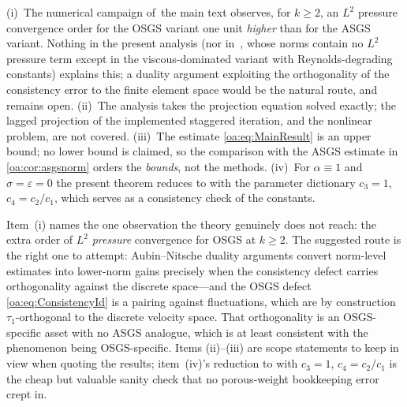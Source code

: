\begin{remark}
\label{oa:rem:open}
(i)~The numerical campaign of~the main text observes, for $k \ge 2$, an $L^2$
pressure convergence order for the OSGS variant one unit \emph{higher} than for the
ASGS variant. Nothing in the present analysis (nor in~\cite{codina2008analysis}, whose norms
contain no $L^2$ pressure term except in the viscous-dominated variant with
Reynolds-degrading constants) explains this; a duality argument exploiting the
orthogonality of the consistency error to the finite element space would be the
natural route, and remains open. (ii)~The analysis takes the projection equation
solved exactly; the lagged projection of the implemented staggered iteration, and the
nonlinear problem, are not covered. (iii)~The estimate \cref{oa:eq:MainResult} is an
upper bound; no lower bound is claimed, so the comparison with the ASGS estimate in
\cref{oa:cor:asgsnorm} orders the \emph{bounds}, not the methods. (iv)~For $\alpha \equiv 1$
and $\sigma = \varepsilon = 0$ the present theorem reduces to
\cite[Theorem~2]{codina2008analysis} with the parameter dictionary $c_3 = 1$,
$c_4 = c_2/c_1$, which serves as a consistency check of the constants.
\end{remark}

\begin{pedagogy}
Item~(i) names the one observation the theory genuinely does not reach: the
extra order of $L^2$ \emph{pressure} convergence for OSGS at $k \ge 2$. The
suggested route is the right one to attempt: Aubin--Nitsche duality arguments
convert norm-level estimates into lower-norm gains precisely when the
consistency defect carries orthogonality against the discrete space---and the
OSGS defect \cref{oa:eq:ConsistencyId} is a pairing against fluctuations,
which are by construction $\tau_1$-orthogonal to the discrete velocity space.
That orthogonality is an OSGS-specific asset with no ASGS analogue, which is
at least consistent with the phenomenon being OSGS-specific. Items
(ii)--(iii) are scope statements to keep in view when quoting the results;
item~(iv)'s reduction to \cite[Theorem~2]{codina2008analysis} with $c_3 = 1$,
$c_4 = c_2/c_1$ is the cheap but valuable sanity check that no porous-weight
bookkeeping error crept in.
\end{pedagogy}


